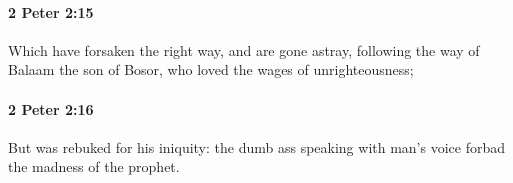 		\paragraph{2 Peter 2:15} %
			\label{2PETER-2-15}

			Which have forsaken the right way, and are gone astray, following the way of Balaam the son of Bosor, who loved the wages of unrighteousness;

			\begin{framed}
			\scriptsize
				\begin{compactdesc}
					\item[SBLG] 
				\end{compactdesc}
			\end{framed}

		\paragraph{2 Peter 2:16} %
			\label{2PETER-2-16}

			But was rebuked for his iniquity: the dumb ass speaking with man's voice forbad the madness of the prophet.

